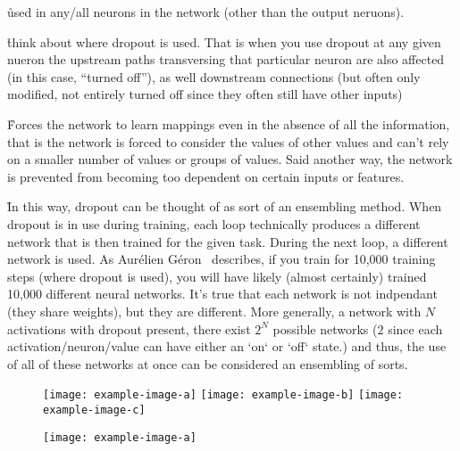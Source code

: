 \r{used in any/all neurons in the network (other than the output neruons).}

\r{think about where dropout is used. That is when you use dropout at any given nueron the upstream paths transversing that particular neuron are also affected (in this case, ``turned off''), as well downstream connections (but often only modified, not entirely turned off since they often still have other inputs) }

\r{Forces the network to learn mappings even in the absence of all the information, that is the network is forced to consider the values of other values and can't rely on a smaller number of values or groups of values. Said another way, the network is prevented from becoming too dependent on certain inputs or features.}

\r{In this way, dropout can be thought of as sort of an ensembling method. When dropout is in use during training, each loop technically produces a different network that is then trained for the given task. During the next loop, a different network is used. As Aurélien Géron~\cite{geron2019hands} describes, if you train for 10,000 training steps (where dropout is used), you will have likely (almost certainly) trained 10,000 different neural networks. It's true that each network is not indpendant (they share weights), but they are different. More generally, a network with $N$ activations with dropout present, there exist $2^N$ possible networks ($2$ since each activation/neuron/value can have either an `on` or `off` state.) and thus, the use of all of these networks at once can be considered an ensembling of sorts.}




\begin{figure}[htp]
	\centering
	\texttt{[image: example-image-a]}\hfil
	\texttt{[image: example-image-b]}\hfil
	\texttt{[image: example-image-c]}\hfil
	\caption{}
	\label{fig:regularization_dropout_overview_training}
\end{figure}

\begin{figure}[htp]
	\centering
	\texttt{[image: example-image-a]}\hfil
	\caption{}
	\label{fig:regularization_dropout_overview_test}
\end{figure}

